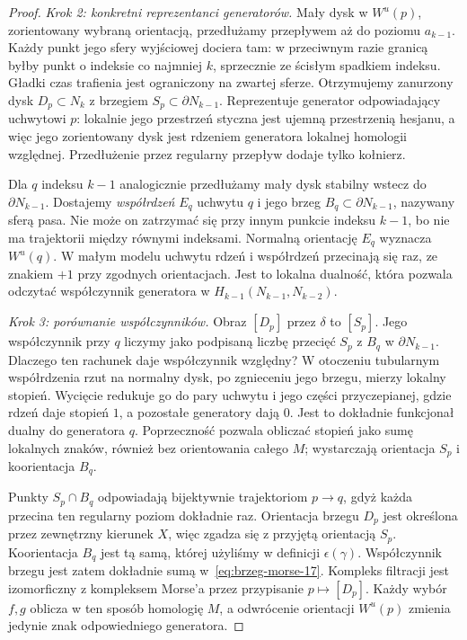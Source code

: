\begin{proof}
\emph{Krok 2: konkretni reprezentanci generatorów.}
Mały dysk w $W^u(p)$, zorientowany wybraną orientacją,
przedłużamy przepływem aż do poziomu $a_{k-1}$.
Każdy punkt jego sfery wyjściowej dociera tam:
w przeciwnym razie granicą byłby punkt o indeksie
co najmniej $k$, sprzecznie ze ścisłym spadkiem indeksu.
Gładki czas trafienia jest ograniczony na zwartej sferze.
Otrzymujemy zanurzony dysk $D_p\subset N_k$
z brzegiem $S_p\subset\partial N_{k-1}$.
Reprezentuje generator odpowiadający uchwytowi $p$:
lokalnie jego przestrzeń styczna jest ujemną przestrzenią
hesjanu, a więc jego zorientowany dysk jest rdzeniem
generatora lokalnej homologii względnej.
Przedłużenie przez regularny przepływ dodaje tylko kołnierz.

Dla $q$ indeksu $k-1$ analogicznie przedłużamy mały
dysk stabilny wstecz do $\partial N_{k-1}$.
Dostajemy \emph{współrdzeń} $E_q$ uchwytu $q$
i jego brzeg $B_q\subset\partial N_{k-1}$,
nazywany sferą pasa. Nie może on zatrzymać się
przy innym punkcie indeksu $k-1$, bo nie ma
trajektorii między równymi indeksami.
Normalną orientację $E_q$ wyznacza $W^u(q)$.
W małym modelu uchwytu rdzeń i współrdzeń przecinają
się raz, ze znakiem $+1$ przy zgodnych orientacjach.
Jest to lokalna dualność, która pozwala odczytać
współczynnik generatora w $H_{k-1}(N_{k-1},N_{k-2})$.

\emph{Krok 3: porównanie współczynników.}
Obraz $[D_p]$ przez $\delta$ to $[S_p]$.
Jego współczynnik przy $q$ liczymy jako podpisaną
liczbę przecięć $S_p$ z $B_q$ w $\partial N_{k-1}$.
Dlaczego ten rachunek daje współczynnik względny?
W otoczeniu tubularnym współrdzenia rzut na normalny
dysk, po zgnieceniu jego brzegu, mierzy lokalny stopień.
Wycięcie redukuje go do pary uchwytu i jego części
przyczepianej, gdzie rdzeń daje stopień $1$,
a pozostałe generatory dają $0$.
Jest to dokładnie funkcjonał dualny do generatora $q$.
Poprzeczność pozwala obliczać stopień jako sumę
lokalnych znaków, również bez orientowania całego $M$;
wystarczają orientacja $S_p$ i koorientacja $B_q$.

Punkty $S_p\cap B_q$ odpowiadają bijektywnie
trajektoriom $p\to q$, gdyż każda przecina ten
regularny poziom dokładnie raz. Orientacja brzegu
$D_p$ jest określona przez zewnętrzny kierunek $X$,
więc zgadza się z przyjętą orientacją $S_p$.
Koorientacja $B_q$ jest tą samą, której użyliśmy
w definicji $\epsilon(\gamma)$. Współczynnik brzegu
jest zatem dokładnie sumą w~\eqref{eq:brzeg-morse-17}.
Kompleks filtracji jest izomorficzny z kompleksem Morse'a
przez przypisanie $p\mapsto[D_p]$.
Każdy wybór $f,g$ oblicza w ten sposób homologię $M$,
a odwrócenie orientacji $W^u(p)$ zmienia jedynie znak
odpowiedniego generatora.
\end{proof}

